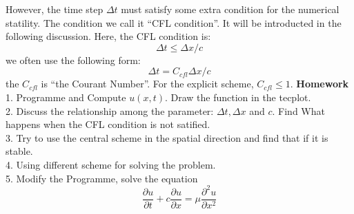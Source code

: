 \documentclass[a4paper]{article}
\begin{document}
However, the time step $\Delta t$ must satisfy some extra condition for the numerical statility. The condition we call it ``CFL condition''. It will be introducted in the following discussion. Here, the CFL condition is:
\begin{equation}
  \Delta t\le \Delta x/c
\end{equation}
we often use the following form:
\begin{equation}
  \Delta t=C_{cfl}\Delta x/c
\end{equation}
the $C_{cfl}$ is ``the Courant Number''. For the explicit scheme, $C_{cfl}\le 1$.
\newline
\textbf{Homework}\\
1. Programme and Compute $u(x,t)$. Draw the function in the tecplot.\\
2. Discuss the relationship among the parameter: $\Delta t, \Delta x$ and $c$. Find What happens when the CFL condition is not satified.\\
3. Try to use the central scheme in the spatial direction and find that if it is stable. \\
4. Using different scheme for solving the problem.\\
5. Modify the Programme, solve the equation \\
\begin{equation}
\frac {\partial u}{\partial t}+c\frac {\partial u}{\partial x}=\mu \frac {\partial^2 u}{\partial x^2}
\end{equation}
\end{document}
